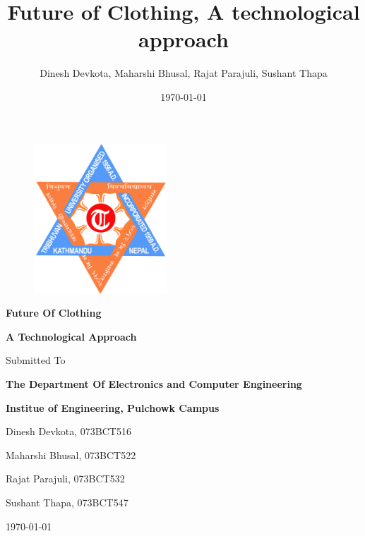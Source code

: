 \documentclass{article}
\title{Future of Clothing, A technological approach}
\author{Dinesh Devkota,
Maharshi Bhusal, Rajat Parajuli, Sushant Thapa}
\date{\today}
\begin{document}
\begin{figure}[H]
    \centering
    \includegraphics[width=5cm]{images/tuLogo.png}
\end{figure}

\begin{center}
\textbf {{\Huge Future Of Clothing}}
\end{center}

\begin{center}
\textbf {{\huge A Technological Approach}}
\end{center}

\begin{center}

Submitted To
\end{center}

\begin{center}
\textbf {{\huge The Department Of Electronics and Computer Engineering}}
\end{center}

\begin{center}
\textbf {{\Small Institue of Engineering, Pulchowk Campus}}
\end{center}

\begin{center}

Dinesh Devkota, 073BCT516
\end{center}

\begin{center}
Maharshi Bhusal, 073BCT522
\end{center}

\begin{center}
Rajat Parajuli, 073BCT532
\end{center}

\begin{center}
Sushant Thapa, 073BCT547
\end{center}

\begin{center}

\today
\end{center}
\newpage
\end{document}
